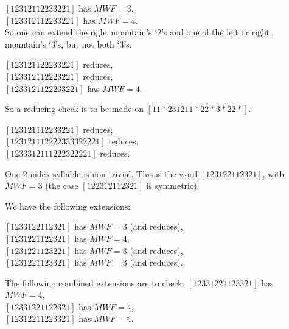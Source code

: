 \begin{caselist}
\begin{caselist}
$[12312112233221]$ has $MWF=3$, \\
$[123312112233221]$ has $MWF=4$. \\

So one can extend the right mountain's `$2$'s and one of the
left or right mountain's `$3$'s, but not both `$3$'s.

$[123121122233221]$ reduces, \\
$[123312112223221]$ reduces, \\
$[1233121122233221]$ has $MWF=4$.

So a reducing check is to be made on $[11*231211*22*3*22*]$.

$[123121112233221]$ reduces, \\
$[123121112222333322221]$ reduces, \\
$[1233312111222322221]$ reduces.

% 
% 
% 
% 
% 
% 
% 
% 

\case
One $2$-index syllable is non-trivial. This is the word
$[123122112321]$, with $MWF=3$ (the case
$[122312112321]$ is symmetric).

We have the following extensions:

$[1233122112321]$ has $MWF=3$ (and reduces), \\
$[1231221122321]$ has $MWF=4$, \\
$[1231221123221]$ has $MWF=3$ (and reduces), \\
$[1231221123321]$ has $MWF=3$ (and reduces).

The following combined extensions are to check:
$[12331221123321]$ has $MWF=4$, \\
$[12331221122321]$ has $MWF=4$, \\
$[12312211223321]$ has $MWF=4$. \\


\end{caselist}
\end{caselist}
